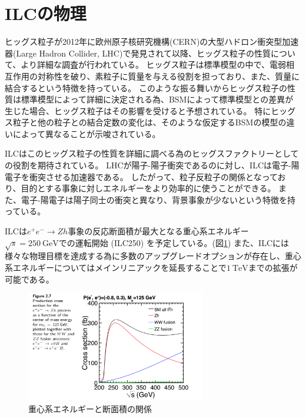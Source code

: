 \section{ILCの物理} \label{Intro:PhysicsofILC}

ヒッグス粒子が2012年に欧州原子核研究機構(CERN)の大型ハドロン衝突型加速器(Large Hadron Collider, LHC)で発見されて以降、ヒッグス粒子の性質について、より詳細な調査が行われている。
ヒッグス粒子は標準模型の中で、電弱相互作用の対称性を破り、素粒子に質量を与える役割を担っており、また、質量に結合するという特徴を持っている。
このような振る舞いからヒッグス粒子の性質は標準模型によって詳細に決定される為、BSMによって標準模型との差異が生じた場合、ヒッグス粒子はその影響を受けると予想されている。
特にヒッグス粒子と他の粒子との結合定数の変化は、そのような仮定するBSMの模型の違いによって異なることが示唆されている。

ILCはこのヒッグス粒子の性質を詳細に調べる為のヒッグスファクトリーとしての役割を期待されている。
LHCが陽子-陽子衝突であるのに対し、ILCは電子-陽電子を衝突させる加速器である。
したがって、粒子反粒子の関係となっており、目的とする事象に対しエネルギーをより効率的に使うことができる。
また、電子-陽電子は陽子同士の衝突と異なり、背景事象が少ないという特徴を持っている。

ILCは$e^+e^- \to Zh$事象の反応断面積が最大となる重心系エネルギー$\sqrt{s}=250\ \mathrm{GeV}$での運転開始 (ILC250) を予定している。(図\ref{4eetoZH})
また、ILCには様々な物理目標を達成する為に多数のアップグレードオプションが存在し、重心系エネルギーについてはメインリニアックを延長することで$1\ \mathrm{TeV}$までの拡張が可能である。

\begin{figure}[h]
 \centering
 \includegraphics[width=0.7\textwidth]{Figure/1Introduction/4eetoZH.png}
 \caption{重心系エネルギーと断面積の関係\cite{TechnicalDesignReportPhysics}}
 \label{4eetoZH}
\end{figure}

